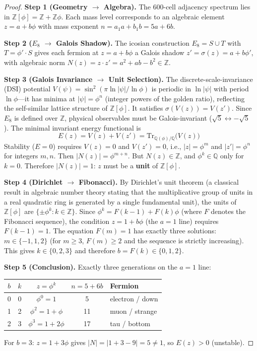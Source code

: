 \documentclass[12pt,a4paper]{article}
\theoremstyle{definition}
\begin{document}
\begin{proof}
\textbf{Step 1 (Geometry $\to$ Algebra).} The 600-cell adjacency spectrum lies in $\mathbb{Z}[\phi] = \mathbb{Z} + \mathbb{Z}\phi$. Each mass level corresponds to an algebraic element $z = a + b\phi$ with mass exponent $n = a_1 a + b_1 b = 5a + 6b$.

\textbf{Step 2 ($E_8$ $\to$ Galois Shadow).} The icosian construction $E_8 = S \cup T$ with $T = \phi' \cdot S$ gives each fermion at $z = a + b\phi$ a Galois shadow $z' = \sigma(z) = a + b\phi'$, with algebraic norm $N(z) = z \cdot z' = a^2 + ab - b^2 \in \mathbb{Z}$.

\textbf{Step 3 (Galois Invariance $\to$ Unit Selection).} The discrete-scale-invariance (DSI) potential $V(\psi) = \sin^2(\pi \ln|\psi|/\ln\phi)$ is periodic in $\ln|\psi|$ with period $\ln\phi$---it has minima at $|\psi| = \phi^n$ (integer powers of the golden ratio), reflecting the self-similar lattice structure of $\mathbb{Z}[\phi]$.  It satisfies $\sigma(V(z)) = V(z')$. Since $E_8$ is defined over $\mathbb{Z}$, physical observables must be Galois-invariant ($\sqrt{5} \leftrightarrow -\sqrt{5}$). The minimal invariant energy functional is
\begin{equation}
E(z) = V(z) + V(z') = \text{Tr}_{\mathbb{Q}(\phi)/\mathbb{Q}}\bigl(V(z)\bigr)
\end{equation}
Stability ($E = 0$) requires $V(z) = 0$ and $V(z') = 0$, i.e., $|z| = \phi^m$ and $|z'| = \phi^n$ for integers $m, n$. Then $|N(z)| = \phi^{m+n}$. But $N(z) \in \mathbb{Z}$, and $\phi^k \in \mathbb{Q}$ only for $k = 0$. Therefore $|N(z)| = 1$: $z$ must be a \textbf{unit} of $\mathbb{Z}[\phi]$.

\textbf{Step 4 (Dirichlet $\to$ Fibonacci).} By Dirichlet's unit theorem (a classical result in algebraic number theory stating that the multiplicative group of units in a real quadratic ring is generated by a single fundamental unit), the units of $\mathbb{Z}[\phi]$ are $\{\pm\phi^k : k \in \mathbb{Z}\}$. Since $\phi^k = F(k-1) + F(k)\phi$ (where $F$ denotes the Fibonacci sequence), the condition $z = 1 + b\phi$ (the $a = 1$ line) requires $F(k-1) = 1$. The equation $F(m) = 1$ has exactly three solutions: $m \in \{-1, 1, 2\}$ (for $m \geq 3$, $F(m) \geq 2$ and the sequence is strictly increasing). This gives $k \in \{0, 2, 3\}$ and therefore $b = F(k) \in \{0, 1, 2\}$.

\textbf{Step 5 (Conclusion).} Exactly three generations on the $a = 1$ line:
\begin{center}
\begin{tabular}{ccccl}
\toprule
$b$ & $k$ & $z = \phi^k$ & $n = 5 + 6b$ & Fermion \\
\midrule
0 & 0 & $\phi^0 = 1$ & 5 & electron / down \\
1 & 2 & $\phi^2 = 1+\phi$ & 11 & muon / strange \\
2 & 3 & $\phi^3 = 1+2\phi$ & 17 & tau / bottom \\
\bottomrule
\end{tabular}
\end{center}
For $b = 3$: $z = 1 + 3\phi$ gives $|N| = |1 + 3 - 9| = 5 \neq 1$, so $E(z) > 0$ (unstable).
\end{proof}
\end{document}
